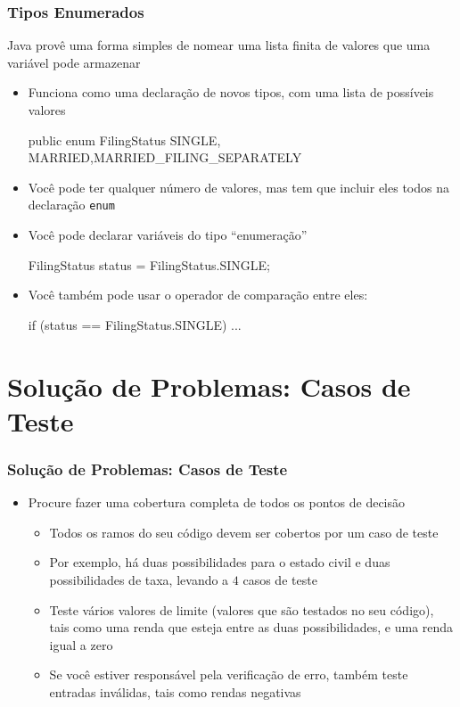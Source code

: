 \documentclass[xcolor={dvipsnames,table},aspectratio=169]{beamer}
\begin{document}
\begin{frame}[fragile]\frametitle{Tipos Enumerados}
Java provê uma forma simples de nomear uma lista finita de valores que uma variável pode armazenar
\begin{itemize}
	\item Funciona como uma declaração de novos tipos, com uma lista de possíveis valores
{\scriptsize
\begin{javacode}
public enum FilingStatus { 
 SINGLE, MARRIED,MARRIED_FILING_SEPARATELY
}
\end{javacode}
}
	\item Você pode ter qualquer número de valores, mas tem que incluir eles todos na declaração \texttt{enum}
	\item Você pode declarar variáveis do tipo ``enumeração''
{\scriptsize
\begin{javacode}
FilingStatus status = FilingStatus.SINGLE;
\end{javacode}
}
	\item Você também pode usar o operador de comparação entre eles:
{\scriptsize
\begin{javacode}
if (status == FilingStatus.SINGLE) ... 
\end{javacode}
}
\end{itemize}
\end{frame}

\section{Solução de Problemas: Casos de Teste}

\begin{frame}\frametitle{Solução de Problemas: Casos de Teste}
\begin{itemize}
	\item Procure fazer uma cobertura completa de todos os pontos de decisão
	\begin{itemize}
		\item Todos os ramos do seu código devem ser cobertos por um caso de teste
		\item Por exemplo, há duas possibilidades para o estado civil e duas possibilidades de taxa, levando a $4$ casos de teste
		\item Teste vários valores de limite (valores que são testados no seu código), tais como uma renda que esteja entre as duas possibilidades, e uma renda igual a zero
		\item Se você estiver responsável pela verificação de erro, também teste entradas inválidas, tais como rendas negativas
	\end{itemize}
\end{itemize}
\end{frame}
\end{document}

